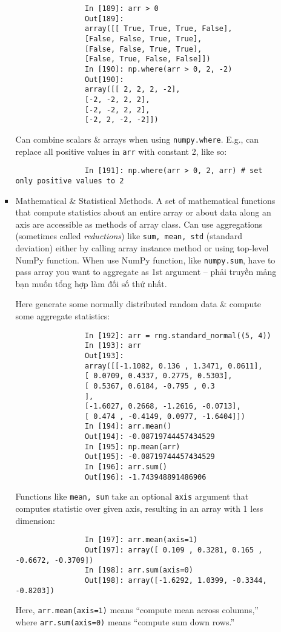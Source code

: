 \documentclass{article}
\begin{document}
\begin{itemize}
\begin{itemize}
\begin{itemize}
\begin{verbatim}
				In [189]: arr > 0
				Out[189]:
				array([[ True, True, True, False],
				[False, False, True, True],
				[False, False, True, True],
				[False, True, False, False]])
				In [190]: np.where(arr > 0, 2, -2)
				Out[190]:
				array([[ 2, 2, 2, -2],
				[-2, -2, 2, 2],
				[-2, -2, 2, 2],
				[-2, 2, -2, -2]])
			\end{verbatim}
			Can combine scalars \& arrays when using {\tt numpy.where}. E.g., can replace all positive values in {\tt arr} with constant 2, like so:
			\begin{verbatim}
				In [191]: np.where(arr > 0, 2, arr) # set only positive values to 2
			\end{verbatim}
			\item {\sf Mathematical \& Statistical Methods.} A set of mathematical functions that compute statistics about an entire array or about data along an axis are accessible as methods of array class. Can use aggregations (sometimes called {\it reductions}) like {\tt sum, mean, std} (standard deviation) either by calling array instance method or using top-level NumPy function. When use NumPy function, like {\tt numpy.sum}, have to pass array you want to aggregate as 1st argument -- phải truyền mảng bạn muốn tổng hợp làm đối số thứ nhất.
			
			Here generate some normally distributed random data \& compute some aggregate statistics:
			\begin{verbatim}
				In [192]: arr = rng.standard_normal((5, 4))
				In [193]: arr
				Out[193]:
				array([[-1.1082, 0.136 , 1.3471, 0.0611],
				[ 0.0709, 0.4337, 0.2775, 0.5303],
				[ 0.5367, 0.6184, -0.795 , 0.3
				],
				[-1.6027, 0.2668, -1.2616, -0.0713],
				[ 0.474 , -0.4149, 0.0977, -1.6404]])
				In [194]: arr.mean()
				Out[194]: -0.08719744457434529
				In [195]: np.mean(arr)
				Out[195]: -0.08719744457434529
				In [196]: arr.sum()
				Out[196]: -1.743948891486906
			\end{verbatim}
			Functions like {\tt mean, sum} take an optional {\tt axis} argument that computes statistic over given axis, resulting in an array with 1 less dimension:
			\begin{verbatim}
				In [197]: arr.mean(axis=1)
				Out[197]: array([ 0.109 , 0.3281, 0.165 , -0.6672, -0.3709])
				In [198]: arr.sum(axis=0)
				Out[198]: array([-1.6292, 1.0399, -0.3344, -0.8203])
			\end{verbatim}
			Here, {\tt arr.mean(axis=1)} means ``compute mean across columns,'' where {\tt arr.sum(axis=0)} means ``compute sum down rows.''
			

\end{itemize}
\end{itemize}
\end{itemize}
\end{document}
